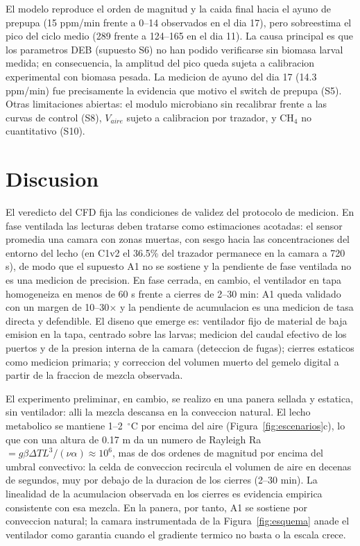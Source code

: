 El modelo reproduce el orden de magnitud y la caida final hacia el ayuno de
prepupa (15 ppm/min frente a 0--14 observados en el dia 17), pero
sobreestima el pico del ciclo medio (289 frente a 124--165 en el dia 11).
La causa principal es que los parametros DEB (supuesto S6) no han podido
verificarse sin biomasa larval medida; en consecuencia, la amplitud del pico
queda sujeta a calibracion experimental con biomasa pesada. La medicion de
ayuno del dia 17 (14.3 ppm/min) fue precisamente la evidencia que motivo el
switch de prepupa (S5). Otras limitaciones abiertas: el modulo microbiano
sin recalibrar frente a las curvas de control (S8), $V_{aire}$ sujeto a
calibracion por trazador, y CH$_4$ no cuantitativo (S10).

\section{Discusion}

El veredicto del CFD fija las condiciones de validez del protocolo de
medicion. En fase ventilada las lecturas deben tratarse como estimaciones
acotadas: el sensor promedia una camara con zonas muertas, con sesgo hacia
las concentraciones del entorno del lecho (en C1v2 el 36.5\% del trazador
permanece en la camara a 720 s), de modo que el supuesto A1 no se sostiene
y la pendiente de fase ventilada no es una medicion de precision. En fase
cerrada, en cambio, el ventilador en tapa homogeneiza en menos de 60 s
frente a cierres de 2--30 min: A1 queda validado con un margen de
10--30$\times$ y la pendiente de acumulacion es una medicion de tasa
directa y defendible. El diseno que emerge es: ventilador fijo de material
de baja emision en la tapa, centrado sobre las larvas; medicion del
caudal efectivo de los puertos y de la presion interna de la camara
(deteccion de fugas); cierres estaticos como medicion primaria; y
correccion del volumen muerto del gemelo digital a partir de la fraccion
de mezcla observada.

El experimento preliminar, en cambio, se realizo en una panera sellada
y estatica, sin ventilador: alli la mezcla descansa en la conveccion
natural. El lecho metabolico se mantiene 1--2~$^{\circ}$C por encima
del aire (Figura~\ref{fig:escenarios}c), lo que con una altura de
0.17 m da un numero de Rayleigh Ra~$= g\beta\Delta T L^{3}/(\nu\alpha)
\approx 10^{6}$, mas de dos ordenes de magnitud por encima del umbral
convectivo: la celda de conveccion recircula el volumen de aire en
decenas de segundos, muy por debajo de la duracion de los cierres
(2--30 min). La linealidad de la acumulacion observada en los cierres
es evidencia empirica consistente con esa mezcla. En la panera, por
tanto, A1 se sostiene por conveccion natural; la camara instrumentada
de la Figura~\ref{fig:esquema} anade el ventilador como garantia
cuando el gradiente termico no basta o la escala crece.

